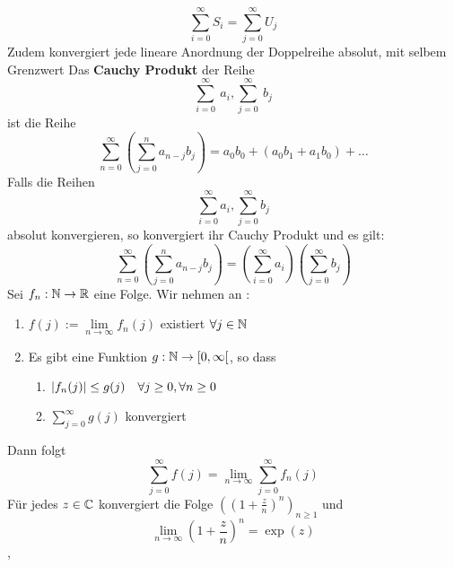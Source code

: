 \[\sum_{i=0}^\infty S_i  =  \sum_{j=0}^\infty U_j\]
Zudem konvergiert jede lineare Anordnung der Doppelreihe absolut, mit selbem Grenzwert \newline
\Def[2.60] Das \textbf{Cauchy Produkt} der Reihe
\[\sum_{i=0}^\infty\ a_i, \sum_{j=0}^\infty\ b_j\]
ist die Reihe
\[\sum_{n=0}^\infty ( \sum_{j=0}^n a_{n-j}b_j )= a_0b_0 + (a_0b_1 + a_1b_0) + \dots \] \newline
\Satz[2.62] Falls die Reihen
\[\sum_{i=0}^\infty a_i , \sum_{j=0}^\infty b_j\]
absolut konvergieren, so konvergiert ihr Cauchy Produkt und es gilt:
\[\sum_{n=0}^{\infty} (\sum_{j=0}^n a_{n-j}b_j) = (\sum_{i=0}^{\infty} a_i) (\sum_{j=0}^{\infty} b_j)\]
\Satz[2.64]  Sei \( f_n : \mathbb{N} \rightarrow \mathbb{R} \) eine Folge. Wir nehmen an :
\begin{enumerate}
    \item [1] \(f(j) := \lim\limits_{n \rightarrow \infty} f_n(j)\) existiert \(\forall j \in \mathbb{N}\)
    \item [2] Es gibt eine Funktion \(g: \mathbb{N} \rightarrow [0, \infty[\), so dass
    \begin {enumerate}
    \item [2.1] \(\left\lvert f_n(j) \right\rvert \leq g(j) \quad \forall j \geq 0, \forall n \geq 0\)
    \item [2.2] \(\sum_{j=0}^\infty g(j)\) konvergiert
    \end{enumerate}
\end{enumerate}
Dann folgt
\[\sum_{j=0}^\infty f(j) = \lim\limits_{n \rightarrow \infty} \sum_{j=0}^\infty f_n(j)\]
\Korollar[2.65] Für jedes \(z \in \mathbb{C} \) konvergiert die Folge \(((1 + \frac{z}{n})^n)_{n \geq 1}\) und
\[\lim\limits_{n \rightarrow \infty} (1 + \frac{z}{n})^n = \exp(z)\]
\sep